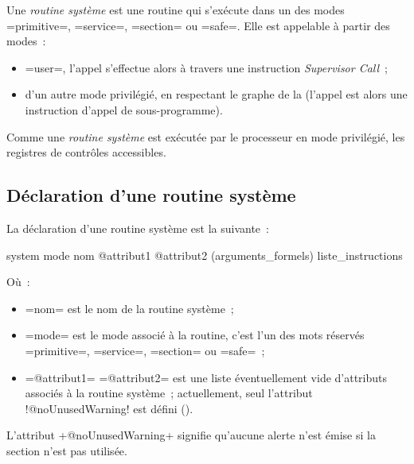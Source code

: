 
Une \emph{routine système} est une routine qui s'exécute dans un des modes \plm=primitive=, \plm=service=, \plm=section= ou \plm=safe=. Elle est appelable à partir des modes~:
\begin{itemize}
 \item \plm=user=, l'appel s'effectue alors à travers une instruction \emph{Supervisor Call}~;
  \item d'un autre mode privilégié, en respectant le graphe de la  (l'appel est alors une instruction d'appel de sous-programme).
\end{itemize}

Comme une \emph{routine système} est exécutée par le processeur en mode privilégié, les registres de contrôles accessibles.




\subsection{Déclaration d'une routine système}


La déclaration d'une routine système est la suivante~:
\begin{PLM}
system mode nom @attribut1 @attribut2 (arguments_formels) {
  liste_instructions
}
\end{PLM}
Où~:
\begin{itemize}
  \item \plm=nom= est le nom de la routine système~;
  \item \plm=mode= est le mode associé à la routine, c'est l'un des mots réservés \plm=primitive=, \plm=service=, \plm=section= ou \plm=safe=~;
  \item \plm=@attribut1= \plm=@attribut2= est une liste éventuellement vide d'attributs associés à la routine système~; actuellement, seul l'attribut \plm!@noUnusedWarning! est défini ().
\end{itemize}











L'attribut \plm+@noUnusedWarning+ signifie qu'aucune alerte n'est émise si la section n'est pas utilisée.




















